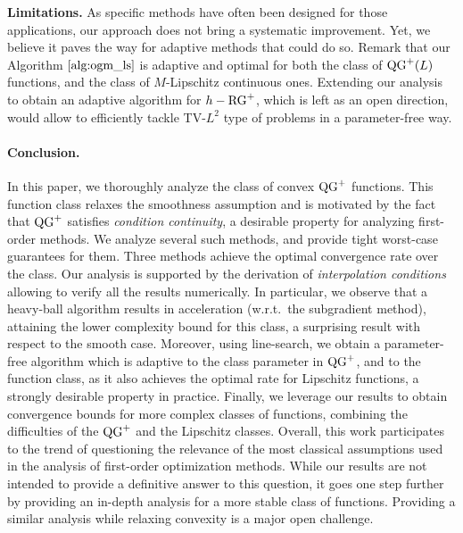 \textbf{Limitations.}
As specific methods have often been designed for those applications, our approach does not bring a systematic improvement. Yet, we believe it paves the way for adaptive methods that could do so.
Remark that our Algorithm $\ref{alg:ogm_ls}$ is adaptive and optimal for both the class of $\operatorname{QG}^+(L)$ functions, and the class of $M$-Lipschitz continuous ones. Extending our analysis to obtain an adaptive algorithm for $h-\operatorname{RG}^+$, which is left as an open direction, would allow to efficiently tackle TV-$L^2$ type of problems in a parameter-free way.

\paragraph{Conclusion.}
In this paper, we thoroughly analyze the class of convex $\operatorname{QG}^+$ functions. This function class relaxes the smoothness assumption and is motivated by the fact that $\operatorname{QG}^+$ satisfies \textit{condition continuity}, a desirable property for analyzing first-order methods. 
We analyze several such methods, and provide tight worst-case guarantees for them.
Three methods achieve the optimal convergence rate over the class. Our analysis is supported by the derivation of \textit{interpolation conditions} allowing to verify all the results numerically. 
In particular, we observe that a heavy-ball algorithm results in acceleration (w.r.t.~the subgradient method), attaining the lower complexity bound for this class, a surprising result with respect to the smooth case.  Moreover, using line-search, we obtain a parameter-free algorithm which is adaptive to the class parameter in $\operatorname{QG}^+$, and to the function class, as it also achieves the optimal rate for Lipschitz functions, a strongly desirable property in practice.  
Finally, we leverage our results to obtain convergence bounds for more complex classes of functions, combining the difficulties of the $\operatorname{QG}^+$ and the Lipschitz classes.
Overall, this work participates to the trend of questioning the relevance of the most classical assumptions used in the analysis of first-order optimization methods. While our results are not intended to provide a definitive answer to this question, it goes one step further by providing an in-depth analysis for a more stable class of functions. Providing a similar analysis while relaxing convexity is a major open challenge.